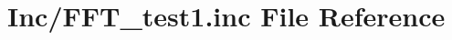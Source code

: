 \hypertarget{_f_f_t__test1_8inc}{}\section{Inc/\+F\+F\+T\+\_\+test1.inc File Reference}
\label{_f_f_t__test1_8inc}
